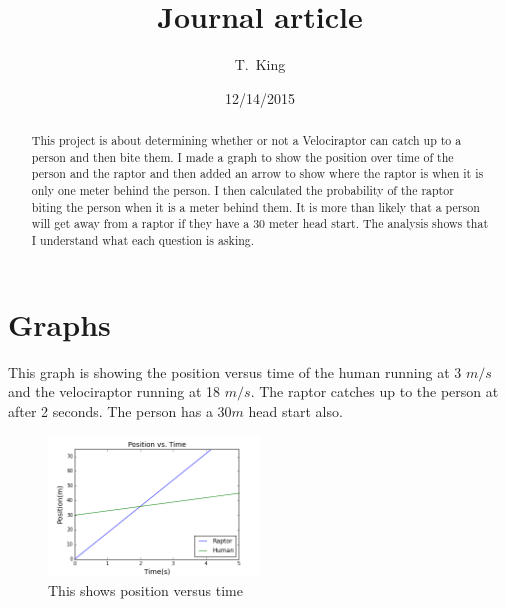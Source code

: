\documentclass[twocolumn]{revtex4}
\begin{document}
\title{
Journal article
}

\author{T.~King}

\date{12/14/2015}

\begin{abstract}
	This project is about determining whether or not a Velociraptor can catch up to a person and then bite them. I made a graph to show the position over time of the person and the raptor and then added an arrow to show where the raptor is when it is only one meter behind the person. I then calculated the probability    
of the raptor biting the person when it is a meter behind them. It is more than likely that a person will get away from a raptor if they have a 30 meter head start. The analysis shows that I understand what each question is asking.    
\end{abstract}

\maketitle

\section{Graphs}
This graph is showing the position versus time of the human running at 3 $m/s$ and the velociraptor running at 18 $m/s$. The raptor catches up to the person at after 2 seconds. The person has a 30$m$ head start also.

\begin{figure}[h]	
	\centering
	\includegraphics[width=0.5\textwidth]{PvT.png}
	\caption{This shows position versus time \label{fig:graph}}	
\end{figure}
\end{document}
